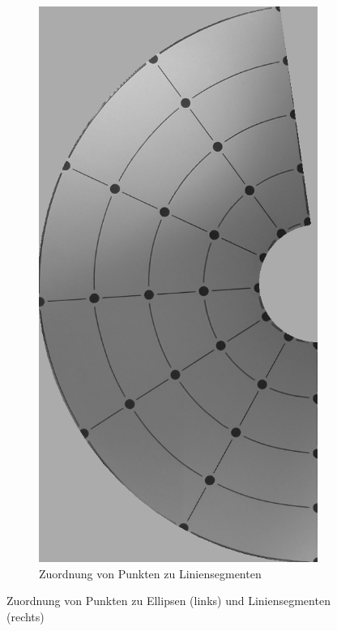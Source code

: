 \begin{figure}[!htb]
\begin{subfigure}{.5\textwidth}
		\includegraphics[angle=-90, width=.9\textwidth]{images/coneRaspUnWarpReverse.png}
		\caption{Zuordnung von Punkten zu Liniensegmenten}
		\label{fig:lineMapping}
	\end{subfigure}
	\caption{Zuordnung von Punkten zu Ellipsen (links) und Liniensegmenten (rechts)}
	\label{fig:mapping}
\end{figure}
